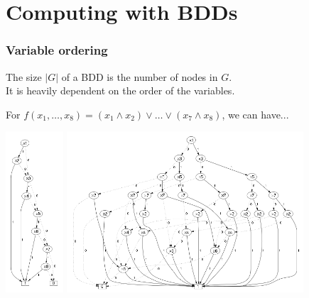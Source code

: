 \documentclass[10pt,a4paper,pdf]{beamer}
\begin{document}
\begin{frame}[t]
{\begin{minipage}[t]{.54\linewidth}
\begin{center}
\end{center}
\end{minipage}}
\end{frame}

\section{Computing with BDDs}

\begin{frame}
\frametitle{Variable ordering}

The size $|G|$ of a BDD is the number of nodes in $G$.\\
It is heavily dependent on the order of the variables.

For $f(x_1, \ldots, x_8) = (x_1 \land x_2) \lor \ldots \lor (x_7 \land x_8)$, we can have...

\includegraphics[height=6cm]{images/good.png}
\includegraphics[height=6cm]{images/bad.png}

\end{frame}
\end{document}
